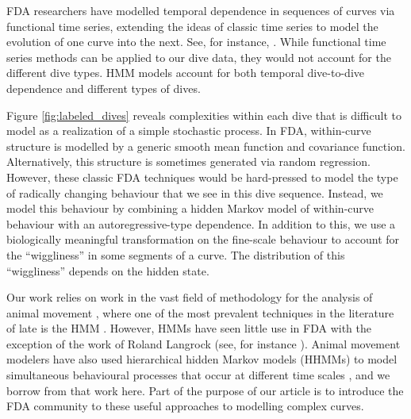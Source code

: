 FDA researchers have modelled temporal dependence in sequences of curves via functional time series, extending the ideas of classic time series to model the evolution of one curve into the next. See, for instance, \cite{Kokoszka:2018}. 
While functional time series methods can be applied to our dive data, they would not account for the different dive types. HMM models account for both temporal dive-to-dive dependence and different types of dives.


 

Figure \ref{fig:labeled_dives} reveals complexities within each dive that is difficult to model as a realization of a simple stochastic process. 
In FDA, within-curve structure is modelled by a generic smooth mean function and covariance function.
Alternatively, this structure is sometimes generated via random regression.
However, these classic FDA techniques would be hard-pressed to model the type of radically changing behaviour that we see in this dive sequence. Instead, we model this behaviour by combining a hidden Markov model of within-curve behaviour with an autoregressive-type dependence. In addition to this, we use a biologically meaningful transformation on the fine-scale behaviour to account for the ``wiggliness'' in some segments of a curve. The distribution of this ``wiggliness'' depends on the hidden state. %

Our work relies on work in the vast field of methodology for the analysis of animal movement
\citep{Hooten:2017,Mcclintock:2020}, where
one of the most prevalent techniques in the literature of late is the HMM \citep{Patterson:2017}. 
However, HMMs have seen little use in FDA with  
the exception of the work of Roland Langrock (see, for instance \citealt{Langrock:2018}).
Animal movement modelers have also used  hierarchical hidden Markov models (HHMMs) to model  simultaneous behavioural processes that occur at different time scales \citep{Barajas:2017,Adam:2019}, and we borrow from that work here. 
Part of the purpose of our article is to introduce the FDA community to these useful approaches to modelling complex curves. 

